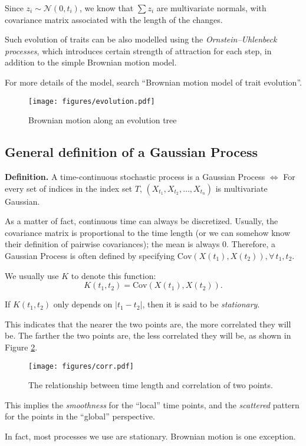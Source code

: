 \documentclass[12pt]{report}
\begin{document}
Since $z_i \sim \mathcal{N}(0, t_i)$, we know that $\sum z_i$ are multivariate normals, with covariance matrix associated with the length of the changes.

Such evolution of traits can be also modelled using the \emph{Ornstein--Uhlenbeck processes}, which introduces certain strength of attraction for each step, in addition to the simple Brownian motion model.

\vskip 0.1in

For more details of the model, search ``Brownian motion model of trait evolution''.

\begin{figure}[hbt]
  \centering
  \texttt{[image: figures/evolution.pdf]}
  \caption{Brownian motion along an evolution tree}
  \label{evo}
\end{figure}

\subsection{General definition of a Gaussian Process}

\vskip 0.1in

\textbf{Definition.} A time-continuous stochastic process is a Gaussian Process $\iff$ For every set of indices in the index set $T$, $(X_{t_1}, X_{t_2}, \ldots, X_{t_n})$ is multivariate Gaussian.

\vskip 0.1in

As a matter of fact, continuous time can always be discretized. Usually, the covariance matrix is proportional to the time length (or we can somehow know their definition of pairwise covariances); the mean is always 0. Therefore, a Gaussian Process is often defined by specifying $\text{Cov}(X(t_1), X(t_2)), \forall \, t_1, t_2$.

\vskip 0.1in

We usually use $K$ to denote this function:
\begin{equation}
	K(t_1, t_2) = \text{Cov}(X(t_1), X(t_2)).
\end{equation}

If $K(t_1, t_2)$ only depends on $|t_1 - t_2|$, then it is said to be \emph{stationary}.

This indicates that the nearer the two points are, the more correlated they will be. The farther the two points are, the less correlated they will be, as shown in Figure \ref{cor}.

\begin{figure}[hbt]
  \centering
  \texttt{[image: figures/corr.pdf]}
  \caption{The relationship between time length and correlation of two points.}
  \label{cor}
\end{figure}

This implies the \emph{smoothness} for the ``local'' time points, and the \emph{scattered} pattern for the points in the ``global'' perspective.

\vskip 0.1in

In fact, most processes we use are stationary. Brownian motion is one exception.
\end{document}
